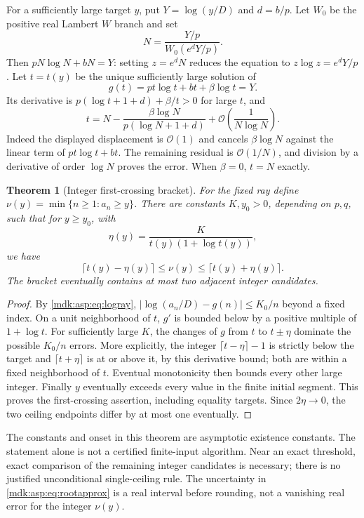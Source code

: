 \documentclass[11pt,letterpaper]{article}
\numberwithin{equation}{section}
\newtheorem{theorem}{Theorem}[section]
\theoremstyle{remark}\newtheorem{remark}[theorem]{Remark}
\newcommand{\Oh}{\mathcal O}\newcommand{\Q}{\mathbb Q}\newcommand{\N}{\mathbb N}\newcommand{\R}{\mathbb R}
\begin{document}
For a sufficiently large target $y$, put $Y=\log(y/D)$ and $d=b/p$. Let $W_0$ be the positive real Lambert $W$ branch and set
\begin{equation}\label{mdk:asp:eq:Lambert}
N=\frac{Y/p}{W_0(e^dY/p)}.
\end{equation}
Then $pN\log N+bN=Y$: setting $z=e^dN$ reduces the equation to $z\log z=e^dY/p$. Let $t=t(y)$ be the unique sufficiently large solution of
\begin{equation}\label{mdk:asp:eq:inverseg}
g(t)=pt\log t+bt+\beta\log t=Y.
\end{equation}
Its derivative is $p(\log t+1+d)+\beta/t>0$ for large $t$, and
\begin{equation}\label{mdk:asp:eq:rootapprox}
t=N-\frac{\beta\log N}{p(\log N+1+d)}+\Oh\left(\frac1{N\log N}\right).
\end{equation}
Indeed the displayed displacement is $\Oh(1)$ and cancels $\beta\log N$ against the linear term of $pt\log t+bt$. The remaining residual is $\Oh(1/N)$, and division by a derivative of order $\log N$ proves the error. When $\beta=0$, $t=N$ exactly.

\begin{theorem}[Integer first-crossing bracket]\label{mdk:asp:thm:inverse}
For the fixed ray define $\nu(y)=\min\{n\ge1:a_n\ge y\}$. There are constants $K,y_0>0$, depending on $p,q$, such that for $y\ge y_0$, with
\[
\eta(y)=\frac{K}{t(y)(1+\log t(y))},
\]
we have
\begin{equation}\label{mdk:asp:eq:ceil}
\lceil t(y)-\eta(y)\rceil\le\nu(y)\le\lceil t(y)+\eta(y)\rceil.
\end{equation}
The bracket eventually contains at most two adjacent integer candidates.
\end{theorem}
\begin{proof}
By \eqref{mdk:asp:eq:logray}, $|\log(a_n/D)-g(n)|\le K_0/n$ beyond a fixed index. On a unit neighborhood of $t$, $g'$ is bounded below by a positive multiple of $1+\log t$. For sufficiently large $K$, the changes of $g$ from $t$ to $t\pm\eta$ dominate the possible $K_0/n$ errors. More explicitly, the integer $\lceil t-\eta\rceil-1$ is strictly below the target and $\lceil t+\eta\rceil$ is at or above it, by this derivative bound; both are within a fixed neighborhood of $t$. Eventual monotonicity then bounds every other large integer. Finally $y$ eventually exceeds every value in the finite initial segment. This proves the first-crossing assertion, including equality targets. Since $2\eta\to0$, the two ceiling endpoints differ by at most one eventually.
\end{proof}
The constants and onset in this theorem are asymptotic existence constants. The statement alone is not a certified finite-input algorithm. Near an exact threshold, exact comparison of the remaining integer candidates is necessary; there is no justified unconditional single-ceiling rule. The uncertainty in \eqref{mdk:asp:eq:rootapprox} is a real interval before rounding, not a vanishing real error for the integer $\nu(y)$.
\end{document}
